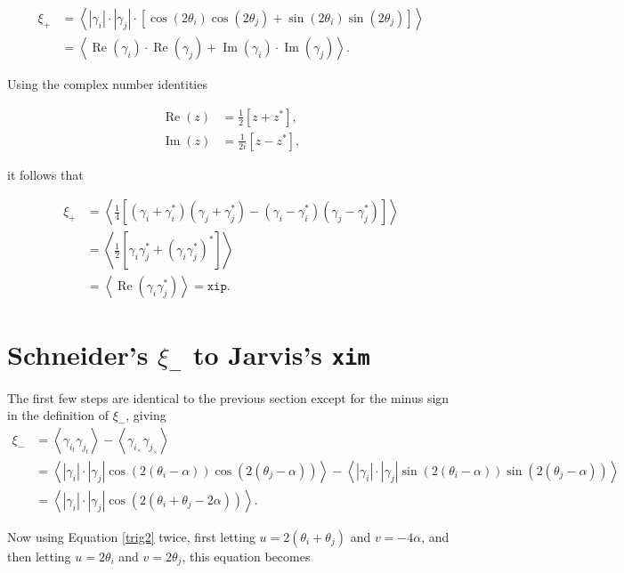 \documentclass[%
 reprint,
 amsmath,amssymb,
 aps,nofootinbib
]{revtex4-1}
\begin{document}
\begin{align*}
\xi_+&=\left<|\gamma_i|\cdot|\gamma_j|\cdot\left[\cos\left(2\theta_i\right)\cos\left(2\theta_j\right)+\sin\left(2\theta_i\right)\sin\left(2\theta_j\right)\right]\right>\\
&=\left<\operatorname{Re}(\gamma_i)\cdot\operatorname{Re}(\gamma_j)+\operatorname{Im}(\gamma_i)\cdot\operatorname{Im}(\gamma_j)\right>.
\end{align*}

Using the complex number identities

\begin{align}
\operatorname{Re}(z)&=\frac{1}{2}\left[z+z^*\right],\label{complex1}\\
\operatorname{Im}(z)&=\frac{1}{2i}\left[z-z^*\right]\label{complex2},
\end{align}

it follows that

\begin{align}
\xi_+&=\left<\frac{1}{4}\left[(\gamma_i+\gamma_i^*)(\gamma_j+\gamma_j^*)-(\gamma_i-\gamma_i^*)(\gamma_j-\gamma_j^*)\right]\right>\nonumber \\
&=\left<\frac{1}{2}\left[\gamma_i\gamma_j^*+(\gamma_i\gamma_j^*)^*\right]\right>\nonumber \\
&=\left<\operatorname{Re}(\gamma_i\gamma_j^*)\right>=\texttt{xip}.
\end{align}

\section*{Schneider's $\xi_-$ to Jarvis's \texttt{xim}}

The first few steps are identical to the previous section except for the minus sign in the definition of $\xi_-$, giving
\begin{align*}
\xi_-&=\left<\gamma_{i_t}\gamma_{j_t}\right>-\left<\gamma_{i_\times}\gamma_{j_\times}\right>\\
&=\left<|\gamma_i|\cdot|\gamma_j|\cos\left(2(\theta_i-\alpha)\right)\cos\left(2(\theta_j-\alpha)\right)\right>-\left<|\gamma_i|\cdot|\gamma_j|\sin\left(2(\theta_i-\alpha)\right)\sin\left(2(\theta_j-\alpha)\right)\right>\\
&=\left<|\gamma_i|\cdot|\gamma_j|\cos\left(2(\theta_i+\theta_j-2\alpha)\right)\right>.
\end{align*}

Now using Equation \eqref{trig2} twice, first letting $u=2(\theta_i+\theta_j)$ and $v=-4\alpha$, and then letting $u=2\theta_i$ and $v=2\theta_j$, this equation becomes
\end{document}
